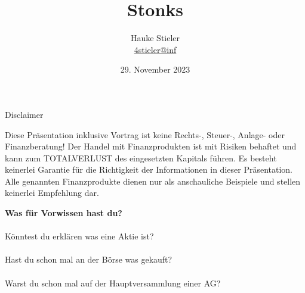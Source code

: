 \documentclass{beamer}
\author[Hauke Stieler]{Hauke Stieler\\\href{mailto:4stieler@informatik.uni-hamburg.de}{4stieler@inf}}
\title{Stonks}
\date{29. November 2023}
\begin{document}
	{
		\maketitle
		\addtocounter{page}{-1}
	}
	
	\begin{frame}{Disclaimer}
		\begin{center}
			Diese Präsentation inklusive Vortrag ist keine Rechts-, Steuer-, Anlage- oder Finanzberatung!\n
			Der Handel mit Finanzprodukten ist mit Risiken behaftet und kann zum TOTALVERLUST des eingesetzten Kapitals führen.\n
			Es besteht keinerlei Garantie für die Richtigkeit der Informationen in dieser Präsentation.\n
			Alle genannten Finanzprodukte dienen nur als anschauliche Beispiele und stellen keinerlei Empfehlung dar.
		\end{center}
	\end{frame}

	\begin{frame}
		\begin{center}
			\textbf{Was für Vorwissen hast du?}\\\pause
			\hfill\\
			Könntest du erklären was eine Aktie ist?\\\pause
			\hfill\\
			Hast du schon mal an der Börse was gekauft?\\\pause
			\hfill\\
			Warst du schon mal auf der Hauptversammlung einer AG?
		\end{center}
	\end{frame}
\end{document}
